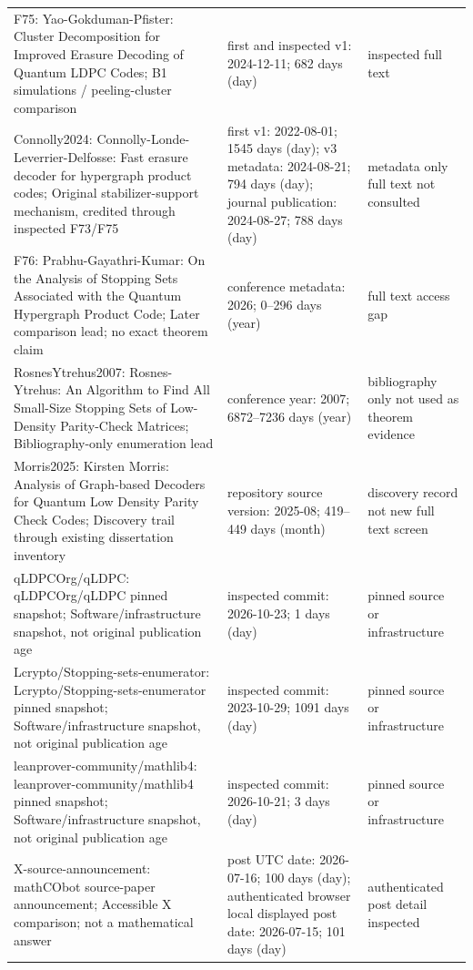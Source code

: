 {\begin{longtable}{@{}>{\raggedright\arraybackslash}p{.27\linewidth}>{\raggedright\arraybackslash}p{.47\linewidth}>{\raggedright\arraybackslash}p{.18\linewidth}@{}}
F75: Yao-Gokduman-Pfister: Cluster Decomposition for Improved Erasure Decoding of Quantum LDPC Codes; B1 simulations / peeling-cluster comparison & first and inspected v1: 2024-12-11; 682 days (day) & inspected full text\\[4pt]
Connolly2024: Connolly-Londe-Leverrier-Delfosse: Fast erasure decoder for hypergraph product codes; Original stabilizer-support mechanism, credited through inspected F73/F75 & first v1: 2022-08-01; 1545 days (day); v3 metadata: 2024-08-21; 794 days (day); journal publication: 2024-08-27; 788 days (day) & metadata only full text not consulted\\[4pt]
F76: Prabhu-Gayathri-Kumar: On the Analysis of Stopping Sets Associated with the Quantum Hypergraph Product Code; Later comparison lead; no exact theorem claim & conference metadata: 2026; 0--296 days (year) & full text access gap\\[4pt]
RosnesYtrehus2007: Rosnes-Ytrehus: An Algorithm to Find All Small-Size Stopping Sets of Low-Density Parity-Check Matrices; Bibliography-only enumeration lead & conference year: 2007; 6872--7236 days (year) & bibliography only not used as theorem evidence\\[4pt]
Morris2025: Kirsten Morris: Analysis of Graph-based Decoders for Quantum Low Density Parity Check Codes; Discovery trail through existing dissertation inventory & repository source version: 2025-08; 419--449 days (month) & discovery record not new full text screen\\[4pt]
qLDPCOrg/qLDPC: qLDPCOrg/qLDPC pinned snapshot; Software/infrastructure snapshot, not original publication age & inspected commit: 2026-10-23; 1 days (day) & pinned source or infrastructure\\[4pt]
Lcrypto/Stopping-sets-enumerator: Lcrypto/Stopping-sets-enumerator pinned snapshot; Software/infrastructure snapshot, not original publication age & inspected commit: 2023-10-29; 1091 days (day) & pinned source or infrastructure\\[4pt]
leanprover-community/mathlib4: leanprover-community/mathlib4 pinned snapshot; Software/infrastructure snapshot, not original publication age & inspected commit: 2026-10-21; 3 days (day) & pinned source or infrastructure\\[4pt]
X-source-announcement: mathCObot source-paper announcement; Accessible X comparison; not a mathematical answer & post UTC date: 2026-07-16; 100 days (day); authenticated browser local displayed post date: 2026-07-15; 101 days (day) & authenticated post detail inspected\\[4pt]

\end{longtable}}
